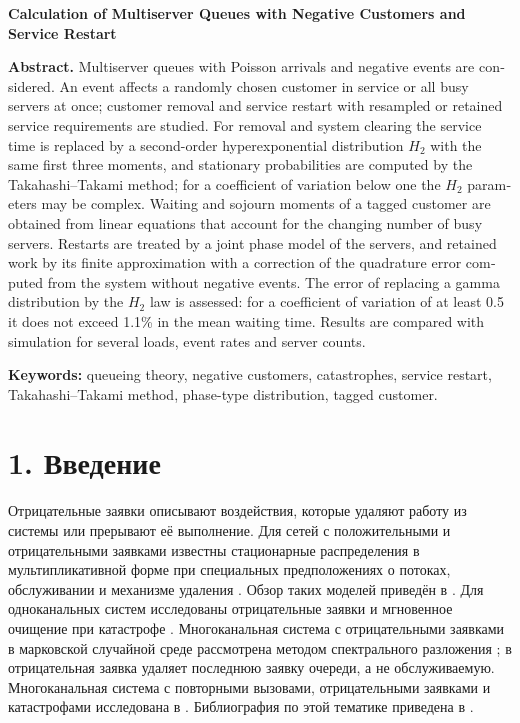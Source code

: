\begin{otherlanguage}{english}
\bigskip
\begin{center}\textbf{Calculation of Multiserver Queues with Negative Customers and Service Restart}\end{center}
\textbf{Abstract.} Multiserver queues with Poisson arrivals and negative events are considered. An event affects a randomly chosen customer in service or all busy servers at once; customer removal and service restart with resampled or retained service requirements are studied. For removal and system clearing the service time is replaced by a second-order hyperexponential distribution \(H_2\) with the same first three moments, and stationary probabilities are computed by the Takahashi--Takami method; for a coefficient of variation below one the \(H_2\) parameters may be complex. Waiting and sojourn moments of a tagged customer are obtained from linear equations that account for the changing number of busy servers. Restarts are treated by a joint phase model of the servers, and retained work by its finite approximation with a correction of the quadrature error computed from the system without negative events. The error of replacing a gamma distribution by the \(H_2\) law is assessed: for a coefficient of variation of at least 0.5 it does not exceed 1.1\% in the mean waiting time. Results are compared with simulation for several loads, event rates and server counts.

\textbf{Keywords:} queueing theory, negative customers, catastrophes, service restart, Takahashi--Takami method, phase-type distribution, tagged customer.
\end{otherlanguage}

\section*{1. Введение}
Отрицательные заявки описывают воздействия, которые удаляют работу из системы или прерывают её выполнение. Для сетей с положительными и отрицательными заявками известны стационарные распределения в мультипликативной форме при специальных предположениях о потоках, обслуживании и механизме удаления \cite{gelenbe1991,gelenbe1992}. Обзор таких моделей приведён в \cite{artalejo2000}. Для одноканальных систем исследованы отрицательные заявки \cite{harrison1996} и мгновенное очищение при катастрофе \cite{jain1996}. Многоканальная система с отрицательными заявками в марковской случайной среде рассмотрена методом спектрального разложения \cite{chakka2001}; в \cite{bocharov2007} отрицательная заявка удаляет последнюю заявку очереди, а не обслуживаемую. Многоканальная система с повторными вызовами, отрицательными заявками и катастрофами исследована в \cite{shin2007}. Библиография по этой тематике приведена в \cite{do2011}.

